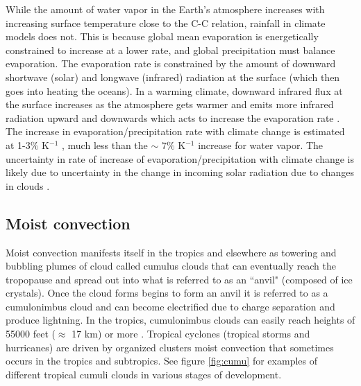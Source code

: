 \documentclass[letterpaper,12pt,titlepage,oneside,final]{book}
\begin{document}
While the amount of water vapor in the Earth's atmosphere increases with increasing surface temperature close to the C-C relation, rainfall in climate models does not. This is because global mean evaporation is energetically constrained to increase at a lower rate, and global precipitation must balance evaporation. The evaporation rate is constrained by the amount of downward shortwave (solar) and longwave (infrared) radiation at the surface (which then goes into heating the oceans). In a warming climate, downward infrared flux at the surface increases as the atmosphere gets warmer and emits more infrared radiation upward and downwards which acts to increase the evaporation rate \citep{boer_climate_1993}. The increase in evaporation/precipitation rate with climate change is estimated at 1-3$\%$ K$^{-1}$ \citep{schneider_water_2010,he_anthropogenic_2015,boer_climate_1993}, much less than the $\sim$ $7 \%$ K$^{-1}$ increase for water vapor. The uncertainty in rate of increase of evaporation/precipitation with climate change is likely due to uncertainty in the change in incoming solar radiation due to changes in clouds \citep{allen_constraints_2002}.

\subsection{Moist convection}\label{moist}

Moist convection manifests itself in the tropics and elsewhere as towering and bubbling plumes of cloud called cumulus clouds that can eventually reach the tropopause and spread out into what is referred to as an ``anvil" (composed of ice crystals). Once the cloud forms begins to form an anvil it is referred to as a cumulonimbus cloud and can become electrified due to charge separation and produce lightning. In the tropics, cumulonimbus clouds can easily reach heights of 55000 feet ($\approx$ 17 km) or more \citep{hollars_comparisons_2004}. Tropical cyclones (tropical storms and hurricanes) are driven by organized clusters moist convection that sometimes occurs in the tropics and subtropics. See figure \ref{fig:cumu} for examples of different tropical cumuli clouds in various stages of development.
\end{document}
